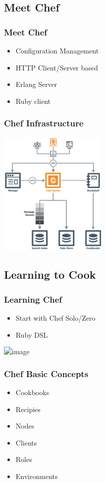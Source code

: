 \subsection{Meet Chef}
\frame
{
  \frametitle{Meet Chef}

  \begin{itemize}
  \item<1-> Configuration Management
  \item<2-> HTTP Client/Server based
  \item<3-> Erlang Server
  \item<4-> Ruby client
  \end{itemize}
}

\frame
{
  \frametitle{Chef Infrastructure}
  \begin{center}%
    \includegraphics[height=6cm]{images/server_components.pdf}
  \end{center}%
}

\subsection{Learning to Cook}
\frame
{
  \frametitle{Learning Chef}

  \begin{itemize}
  \item<1-> Start with Chef Solo/Zero
  \item<2-> Ruby DSL
  \end{itemize}
  \includegraphics<3->[scale=0.5]{images/recipe.png}
}

\frame
{
  \frametitle{Chef Basic Concepts}

  \begin{itemize}
  \item<1-> Cookbooks
  \item<2-> Recipies
  \item<3-> Nodes
  \item<4-> Clients
  \item<5-> Roles
  \item<6-> Environments
  \end{itemize}
}

